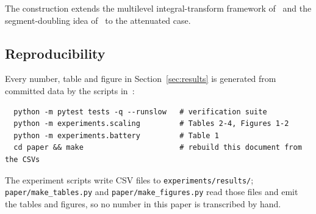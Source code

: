 \documentclass[11pt]{article}
\begin{document}
The construction extends the multilevel integral-transform framework
of~\citep{brandtlubrecht1990,brandt1991} and the segment-doubling idea
of~\citep{brandtdym1999} to the attenuated case.

\subsection*{Reproducibility}

Every number, table and figure in Section~\ref{sec:results} is generated from
committed data by the scripts in~\citep{tomogrid}:

\begin{verbatim}
  python -m pytest tests -q --runslow   # verification suite
  python -m experiments.scaling         # Tables 2-4, Figures 1-2
  python -m experiments.battery         # Table 1
  cd paper && make                      # rebuild this document from the CSVs
\end{verbatim}

\noindent
The experiment scripts write CSV files to \texttt{experiments/results/};
\texttt{paper/make\_tables.py} and \texttt{paper/make\_figures.py} read those
files and emit the tables and figures, so no number in this paper is
transcribed by hand.



\end{document}
